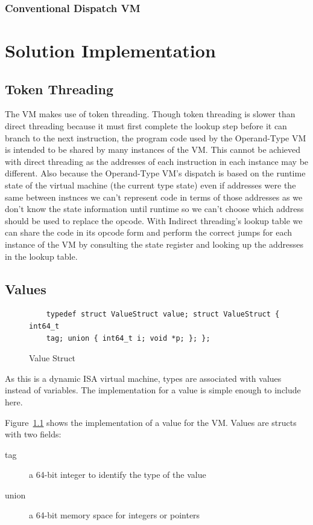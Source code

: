 \documentclass[english,a4paper]{report}
\begin{document}
\subsection{Conventional Dispatch VM}

\chapter{Solution Implementation}

\section{Token Threading}

The VM makes use of token threading. Though token threading is slower
than direct threading \cite{Shi2007} because it must first complete
the lookup step before it can branch to the next instruction, the
program code used by the Operand-Type VM is intended to be shared by
many instances of the VM. This cannot be achieved with direct
threading as the addresses of each instruction in each instance may be
different. Also because the Operand-Type VM's dispatch is based
on the runtime state of the virtual machine (the current type state)
even if addresses were the same between instnces we can't represent
code in terms of those addresses as we don't know the state
information until runtime so we can't choose which address should be
used to replace the opcode. With Indirect threading's lookup table we
can share the code in its opcode form and perform the correct jumps
for each instance of the VM by consulting the state register and
looking up the addresses in the lookup table.

\section{Values}

\begin{figure}
	\begin{lstlisting}
	typedef struct ValueStruct value; struct ValueStruct { int64_t
	tag; union { int64_t i; void *p; }; };
	\end{lstlisting}
	\label{fig:struct}
	\caption{Value Struct}
\end{figure}

As this is a dynamic ISA virtual machine, types are associated with
values instead of variables\cite{RobertoIerusalimschy}. The
implementation for a value is simple enough to include here.

Figure~\ref{fig:struct} shows the implementation of a value for the
VM. Values are structs with two fields:
\begin{description}
	\item[tag] a 64-bit integer to identify the type of the value
	\item[union] a 64-bit memory space for integers or pointers
\end{description}
\end{document}
